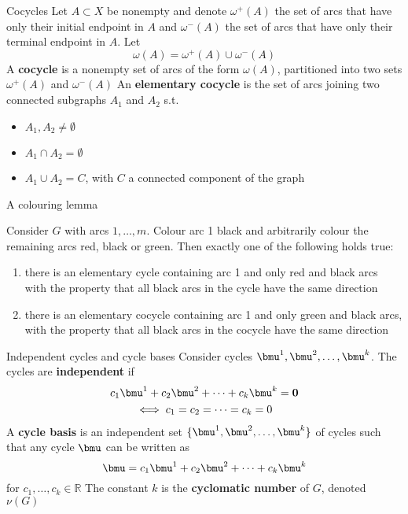 \documentclass[aspectratio=43]{beamer}
\def\IR{\mathbb{R}}
\def\b0{\mathbf{0}}
\begin{document}
\begin{frame}{Cocycles}
Let $A\subset X$ be nonempty and denote $\omega^+(A)$ the set of arcs that have only their initial endpoint in $A$ and $\omega^-(A)$ the set of arcs that have only their terminal endpoint in $A$. Let
\[
\omega(A)=\omega^+(A)\cup\omega^-(A)
\]
\vfill
A \textbf{cocycle} is a nonempty set of arcs of the form $\omega(A)$, partitioned into two sets $\omega^+(A)$ and $\omega^-(A)$
\vfill
An \textbf{elementary cocycle} is the set of arcs joining two connected subgraphs $A_1$ and $A_2$ s.t. 
\begin{itemize}
\item $A_1,A_2\neq\emptyset$
\item $A_1\cap A_2=\emptyset$
\item $A_1\cup A_2=C$, with $C$ a connected component of the graph
\end{itemize}
\end{frame}


\begin{frame}{A colouring lemma}
\begin{lemma}\label{lemma:arc_colouring_lemma}
Consider $G$ with arcs $1,\ldots,m$. Colour arc 1 black and arbitrarily colour the remaining arcs red, black or green. Then exactly one of the following holds true:
\begin{enumerate}
\item there is an elementary cycle containing arc 1 and only red and black
arcs with the property that all black arcs in the cycle have the same
direction
\item there is an elementary cocycle containing arc 1 and only green and black
arcs, with the property that all black arcs in the cocycle have the same
direction
\end{enumerate}
\end{lemma}
\end{frame}

\begin{frame}{Independent cycles and cycle bases}
Consider cycles $\bmu^1,\bmu^2,\ldots,\bmu^k$. The cycles are \textbf{independent} if
\begin{multline*}
c_1\bmu^1+c_2\bmu^2+\cdots+c_k\bmu^k=\b0 \\
\iff
c_1=c_2=\cdots=c_k=0
\end{multline*}
A \textbf{cycle basis} is an independent set $\{\bmu^1,\bmu^2,\ldots,\bmu^k\}$ of cycles such that any cycle $\bmu$ can be written as
\[
\bmu= c_1\bmu^1+c_2\bmu^2+\cdots+c_k\bmu^k
\]
for $c_1,\ldots,c_k\in\IR$
\vfill
The constant $k$ is the \textbf{cyclomatic number} of $G$, denoted $\nu(G)$
\end{frame}
\end{document}
